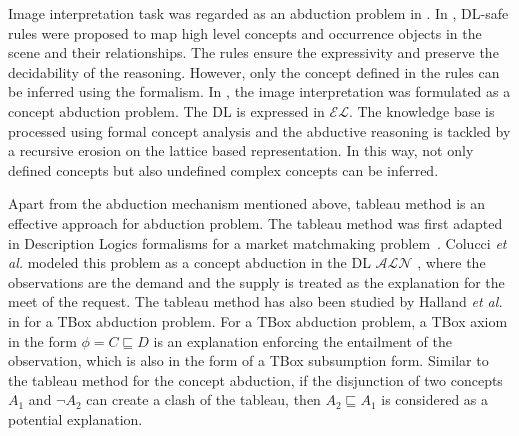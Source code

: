 \documentclass{article}
\begin{document}
Image interpretation task was regarded as an abduction problem in \cite{atif2014explanatory,gries2010probabilistic,neumann2008scene,shanahan2005perception}.
In \cite{neumann2008scene}, DL-safe rules were proposed to map high level concepts and occurrence objects in the scene and their relationships.
The rules ensure the expressivity and preserve the decidability of the reasoning. However, only the concept defined in the rules can be inferred using 
the formalism. In \cite{atif2014explanatory}, the image interpretation was formulated as a concept abduction problem.
The DL is expressed in $\mathcal{EL}$. The knowledge base is processed using formal concept analysis and the abductive reasoning is tackled
by a recursive erosion on the lattice based representation. In this way, not only defined concepts but also undefined complex concepts can be inferred.


Apart from the abduction mechanism mentioned above, tableau method is an effective approach for abduction problem.
The tableau method was first adapted in Description Logics formalisms for a market matchmaking problem~\cite{colucci2004uniform}.
Colucci \textit{et al.} modeled this problem as a concept abduction in the DL $\mathcal{ALN}$ \cite{colucci2004uniform},
where the observations are the demand and the supply is treated as the explanation for the meet of the request.
The tableau method has also been studied by Halland \textit{et al.} in \cite{halland2014tbox} for a TBox abduction problem.
For a TBox abduction problem, a TBox axiom in the form $\phi= C\sqsubseteq D$ is an explanation enforcing the entailment of the observation,
which is also in the form of  a TBox subsumption form. Similar to the tableau method for the  concept abduction, if the disjunction of
two concepts $A_1$  and $\neg A_2$ can create a clash of the tableau, then $A_2 \sqsubseteq A_1$ is considered as a potential explanation.
\end{document}
